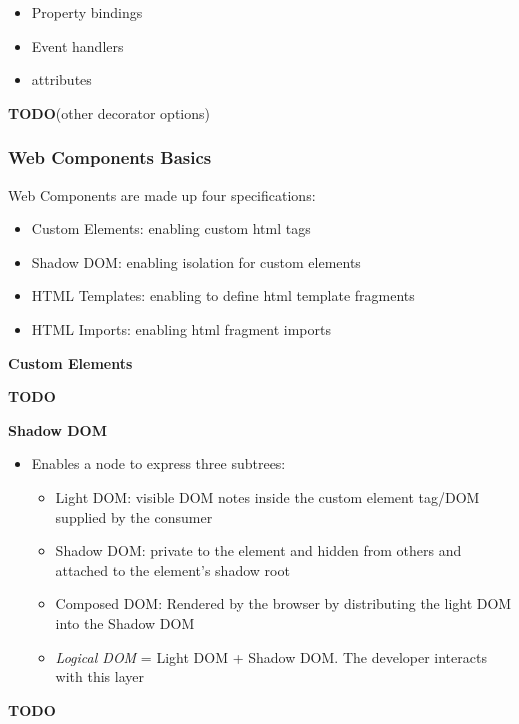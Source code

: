 \documentclass[12pt,]{article}
\providecommand{\tightlist}{%
  \setlength{\itemsep}{0pt}\setlength{\parskip}{0pt}}
\begin{document}
\begin{itemize}
  \begin{itemize}
  \tightlist
  \item
    Property bindings
  \item
    Event handlers
  \item
    attributes
  \end{itemize}
\end{itemize}

\textbf{TODO}(other decorator options)

\subsubsection{Web Components Basics}\label{web-components-basics}

Web Components are made up four specifications:

\begin{itemize}
\tightlist
\item
  Custom Elements: enabling custom html tags
\item
  Shadow DOM: enabling isolation for custom elements
\item
  HTML Templates: enabling to define html template fragments
\item
  HTML Imports: enabling html fragment imports
\end{itemize}

\textbf{Custom Elements}

\textbf{TODO}

\textbf{Shadow DOM}

\begin{itemize}
\tightlist
\item
  Enables a node to express three subtrees:

  \begin{itemize}
  \tightlist
  \item
    Light DOM: visible DOM notes inside the custom element tag/DOM
    supplied by the consumer
  \item
    Shadow DOM: private to the element and hidden from others and
    attached to the element's shadow root
  \item
    Composed DOM: Rendered by the browser by distributing the light DOM
    into the Shadow DOM
  \item
    \emph{Logical DOM} = Light DOM + Shadow DOM. The developer interacts
    with this layer
  \end{itemize}
\end{itemize}

\textbf{TODO}
\end{document}
